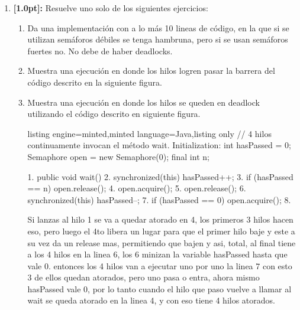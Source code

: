 \documentclass[a4paper,11pt]{article}
\begin{document}
\begin{enumerate}
        \item{\textbf{[1.0pt]:} Resuelve uno solo de los siguientes ejercicios:
        \begin{enumerate}
            \item {Da una implementación con a lo más 10 lineas de código, en la que si se utilizan semáforos débiles se tenga hambruna, pero si se usan semáforos fuertes no. No debe de haber deadlocks.
            }
            \item {Muestra una ejecución en donde los hilos logren pasar la barrera del código descrito en la siguiente figura.
            }
            \item {Muestra una ejecución en donde los hilos se queden en deadlock utilizando el código descrito en siguiente figura.
            }

        \begin{tcblisting}{listing engine=minted,minted language=Java,listing only}
        // 4 hilos continuamente invocan el método wait.
        Initialization:
        int hasPassed = 0;
        Semaphore open = new Semaphore(0);
        final int n;
        
        1. public void wait() {
        2.  synchronized(this) { hasPassed++; }
        3.  if (hasPassed == n) open.release();
        4.  open.acquire();
        5.  open.release();
        6.  synchronized(this) { hasPassed--; }
        7.  if (hasPassed == 0) open.acquire();
        8. }
        \end{tcblisting}

        Si lanzas al hilo 1 se va a quedar atorado en 4, los primeros 3 hilos hacen eso, pero luego el 4to libera un lugar
        para que el primer hilo baje y este a su vez da un release mas, permitiendo que bajen y asi, total, al final tiene a los 4 hilos
        en la linea 6, los 6 minizan la variable hasPassed hasta que vale 0. entonces los 4 hilos van a ejecutar uno por uno la linea 7
        con esto 3 de ellos quedan atorados, pero uno pasa o entra, ahora mismo hasPassed vale 0, por lo tanto cuando el hilo que paso
        vuelve a llamar al wait se queda atorado en la linea 4, y con eso tiene 4 hilos atorados.

        \end{enumerate}
        }


\end{enumerate}
\end{document}
